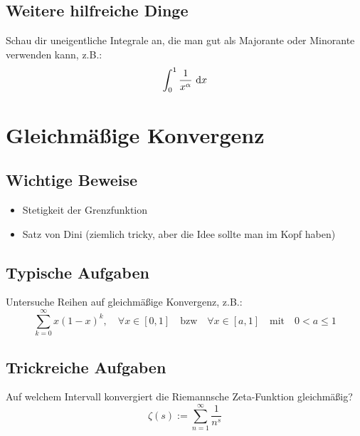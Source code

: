 \subsection{Weitere hilfreiche Dinge}
Schau dir uneigentliche Integrale an, die man gut als Majorante oder Minorante
verwenden kann, z.B.:
\begin{equation*}
    \int_0^1 \frac{1}{x^\alpha}\text{ d}x
\end{equation*}

\section{Gleichmäßige Konvergenz}
\subsection{Wichtige Beweise}
\begin{itemize}
  \item Stetigkeit der Grenzfunktion
  \item Satz von Dini (ziemlich tricky, aber die Idee sollte man im Kopf haben)
\end{itemize}

\subsection{Typische Aufgaben}
Untersuche Reihen auf gleichmäßige Konvergenz, z.B.:
\begin{equation*}
    \sum_{k=0}^\infty x{(1-x)}^k,\quad \forall x \in [0,1] \quad \text{bzw} \quad \forall x \in [a,1] \quad \text{mit} \quad 0 < a \leq 1
\end{equation*}

\subsection{Trickreiche Aufgaben}
Auf welchem Intervall konvergiert die Riemannsche Zeta-Funktion gleichmäßig?
\begin{equation*}
    \zeta(s):=\sum_{n=1}^\infty \frac{1}{n^s}
\end{equation*}
